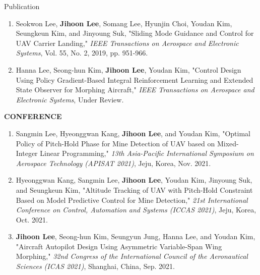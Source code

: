 \documentclass{resume}
\begin{document}
\begin{rSection}{Publication}
\begin{enumerate}
		\item Seokwon Lee, \textbf{\color{coolblack}Jihoon Lee}, Somang Lee, Hyunjin Choi, Youdan Kim, Seungkeun Kim, and Jinyoung Suk, "Sliding Mode Guidance and Control for UAV Carrier Landing," \textit{IEEE Transactions on Aerospace and Electronic Systems}, Vol. 55, No. 2, 2019, pp. 951-966. 
		
		\color{gray}
		
		\item Hanna Lee, Seong-hun Kim, \textbf{\color{coolblack}Jihoon Lee}, Youdan Kim, "Control Design Using Policy Gradient-Based Integral Reinforcement Learning and Extended State Observer for Morphing Aircraft," \textit{IEEE Transactions on Aerospace and Electronic Systems}, Under Review.
	\end{enumerate}\renewcommand{\labelenumi}{\theenumi.}
	
	\textbf{CONFERENCE}
	\begin{enumerate}\renewcommand{\labelenumi}{[C\theenumi]}
		
		\item Sangmin Lee, Hyeonggwan Kang, \textbf{\color{coolblack}Jihoon Lee}, and Youdan Kim, "Optimal Policy of Pitch-Hold Phase for Mine Detection of UAV based on Mixed-Integer Linear Programming," \textit{13th Asia-Pacific International Symposium on Aerospace Technology (APISAT 2021)}, Jeju, Korea, Nov. 2021. 
				
		\item Hyeonggwan Kang, Sangmin Lee, \textbf{\color{coolblack}Jihoon Lee}, Youdan Kim, Jinyoung Suk, and Seungkeun Kim, "Altitude Tracking of UAV with Pitch-Hold Constraint Based on Model Predictive Control for Mine Detection," \textit{21st International Conference on Control, Automation and Systems (ICCAS 2021)}, Jeju, Korea, Oct. 2021. 
		
		\item \textbf{\color{coolblack}Jihoon Lee}, Seong-hun Kim, Seungyun Jung, Hanna Lee, and Youdan Kim, "Aircraft Autopilot Design Using Asymmetric Variable-Span Wing Morphing," \textit{32nd Congress of the International Council of the Aeronautical Sciences (ICAS 2021)}, Shanghai, China, Sep. 2021. 
		

\end{enumerate}
\end{rSection}
\end{document}
